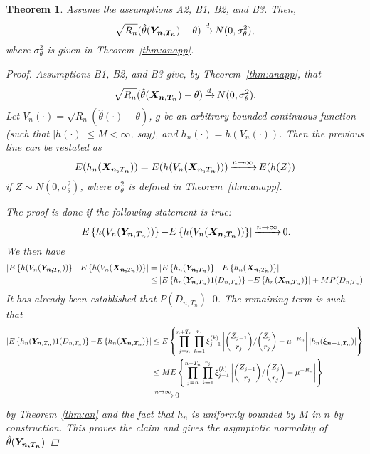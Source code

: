 \documentclass[11 pt]{article}
\newtheorem{thm}{Theorem}
\renewcommand{\th}{\theta}
\newcommand{\xra}[1]{\mathop{ \xrightarrow{#1} }}
\newcommand{\fbr}[1]{ \mathop{ \left\{ #1 \right\} } }
\newcommand{\boldXnt}{\mbox{\boldmath $X_{n,T_n}$}}
\newcommand{\boldYnt}{\mbox{\boldmath $Y_{n,T_n}$}}
\begin{document}
\begin{thm}
\label{thm:anYn}
Assume the assumptions A2, B1, B2, and B3. Then,
\[
\sqrt{R_n}(\hat{\th}(\boldYnt) - \th) \xra{d} N(0, \sigma^2_{\th}),
\]
where $\sigma^2_{\th}$ is given in Theorem~\ref{thm:anapp}.
\begin{proof}
Assumptions B1, B2, and B3 give, by Theorem~\ref{thm:anapp}, that
\[
\sqrt{R_n}(\hat{\th}(\boldXnt) - \th) \xra{d} N(0, \sigma^2_{\th}).
\]
Let $V_n(\cdot) = \sqrt{R_n}(\hat{\th}(\cdot) - \th)$, $g$ be an arbitrary bounded continuous function (such that $|h(\cdot)| \leq M < \infty$, say), and $h_n(\cdot) = h(V_n(\cdot))$. Then the previous line can be restated as
\[
E(h_n(\boldXnt)) = E(h(V_n(\boldXnt))) \xra{n \rightarrow \infty} E(h(Z))
\]
if $Z \sim N(0,\sigma_{\th}^2)$, where $\sigma_{\th}^2$ is defined in Theorem~\ref{thm:anapp}. 

The proof is done if the following statement is true:
\[
\left | E \fbr{ h(V_n(\boldYnt)) } - E \fbr{ h(V_n(\boldXnt)) } \right | \xra{n \rightarrow \infty} 0.
\]
We then have
\begin{align*}
\left | E \fbr{ h(V_n(\boldYnt)) } - E \fbr{ h(V_n(\boldXnt)) } \right | &= \left | E \fbr{ h_n(\boldYnt) } - E \fbr{ h_n(\boldXnt) } \right | \\
&\leq \left | E \fbr{ h_n(\boldYnt)1(D_{n,T_n}) } - E \fbr{ h_n(\boldXnt) } \right | + M P(D_{n,T_n})
\end{align*}
It has already been established that $P(D_{n,T_n}) \xra{n \rightarrow \infty} 0$. The remaining term is such that
\begin{align*}
\left | E \fbr{ h_n(\boldYnt) 1(D_{n,T_n}) } - E \fbr{ h_n(\boldXnt) } \right | &\leq E \fbr{ \prod_{j=n}^{n+T_n} \prod_{k=1}^{r_j} \xi_{j-1}^{(k)} \left | {{Z_{j-1}}\choose{r_j}} / {{Z_j}\choose{r_j}} - \mu^{-R_n} \right | \left | h_n(\mbox{\boldmath $\xi_{n-1,T_n}$}) \right| } \\
&\leq M E \fbr{ \prod_{j=n}^{n+T_n} \prod_{k=1}^{r_j} \xi_{j-1}^{(k)} \left | {{Z_{j-1}}\choose{r_j}} / {{Z_j}\choose{r_j}} - \mu^{-R_n} \right | } \\
&\xra{n \rightarrow \infty} 0
\end{align*}
by Theorem~\ref{thm:an} and the fact that $h_n$ is uniformly bounded by $M$ in $n$ by construction. This proves the claim and gives the asymptotic normality of $\hat{\th}(\boldYnt)$

\end{proof}
\end{thm}
\end{document}
